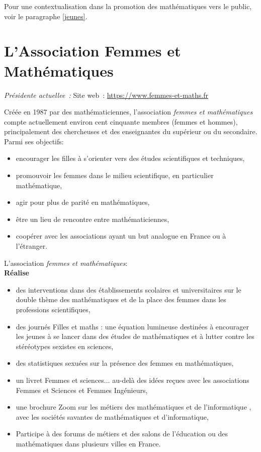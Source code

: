 Pour une contextualisation dans la promotion des math\'ematiques vers le public, voir le paragraphe \ref{jeunes}.\\




\section{L'Association Femmes et Math\'ematiques}

\emph{Pr\'esident\mp e actuel\mp lee~: } \hfill Site web~: \url{https://www.femmes-et-maths.fr}
\smallskip

Cr\'e\'ee en 1987 par des math\'ematiciennes, l'association \textit{femmes et math\'ematiques} compte actuellement environ cent cinquante membres (femmes et hommes), principalement des chercheuses et des enseignantes du sup\'erieur ou du secondaire. Parmi ses objectifs:
\begin{itemize}
\item encourager les filles \`a s'orienter vers des \'etudes scientifiques et techniques,
\item promouvoir les femmes dans le milieu scientifique, en particulier math\'ematique,
\item agir pour plus de parit\'e en math\'ematiques,
\item \^etre un lieu de rencontre entre math\'ematiciennes,
\item coop\'erer avec les associations ayant un but analogue en France ou \`a l'\'etranger.
\end{itemize}

L'association \textit{femmes et math\'ematiques}: \\
\textbf{R\'ealise}
\begin{itemize}
\item  des interventions dans des \'etablissements scolaires et universitaires sur le double th\`eme des math\'ematiques et de la place des femmes dans les professions scientifiques,
\item des journ\'es \og Filles et maths : une \'equation lumineuse  \fg destin\'ees \`a encourager les jeunes \`a se lancer dans des \'etudes de math\'ematiques et \`a lutter contre les st\'er\'eotypes sexistes en sciences,
\item des statistiques sexu\'ees sur la pr\'esence des femmes en math\'ematiques,
\item un livret \og Femmes et sciences... au-del\`a des id\'ees re\c cues \fg  avec les associations Femmes et Sciences et Femmes Ing\'enieurs,
\item une brochure \og Zoom sur les m\'etiers des math\'ematiques et de l'informatique \fg, avec les soci\'et\'es savantes de math\'ematiques et d'informatique,
\item Participe \`a des forums de m\'etiers et des salons de l'\'education ou des math\'ematiques dans plusieurs villes en France.
 \end{itemize}

